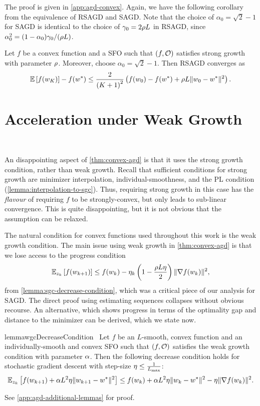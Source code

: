 \noindent The proof is given in \autoref{app:agd-convex}.
Again, we have the following corollary from the equivalence of \ac{RSAGD} and \ac{SAGD}. 
Note that the choice of \( \alpha_0 = \sqrt{2} - 1 \) for \ac{SAGD} is identical to the choice of \( \gamma_0 = 2 \sgc L \) in \ac{RSAGD}, since \( \alpha_0^2 = (1 - \alpha_0) \gamma_0 / (\sgc L) \).

\begin{corollary}
    Let \( f \) be a convex function and \oracle{} a \ac{SFO} such that \( \rbr{f, \oracle{}} \) satisfies strong growth with parameter \( \sgc \).
    Moreover, choose \( \alpha_0 = \sqrt{2} - 1 \).
    Then \ac{RSAGD} converges as  
    \[ \E\sbr{f(\w_K)} - f(\wopt) \leq \frac{2}{\rbr{K+1}^2}\rbr{f(\w_0) - f(\wopt) + \sgc L \norm{\w_0 - \wopt}^2 }. \]
\end{corollary}

\section{Acceleration under Weak Growth}~\label{sec:agd-weak-growth}

 An disappointing aspect of \autoref{thm:convex-agd} is that it uses the strong growth condition, rather than weak growth.
 Recall that sufficient conditions for strong growth are minimizer interpolation, individual-smoothness, and the \ac{PL} condition (\autoref{lemma:interpolation-to-sgc}). 
 Thus, requiring strong growth in this case has the \emph{flavour} of requiring \( f \) to be strongly-convex, but only leads to sub-linear convergence.
This is quite disappointing, but it is not obvious that the assumption can be relaxed.

The natural condition for convex functions used throughout this work is the weak growth condition.
The main issue using weak growth in \autoref{thm:convex-agd} is that we lose access to the progress condition 
\[ \Ek \sbr{f(\wkk)} \leq f(\wk) - \etak \rbr{1 - \frac{\sgc L \eta}{2}} \norm{\grad(\wk)}^2, \]
from \autoref{lemma:sgc-decrease-condition}, which was a critical piece of our analysis for \ac{SAGD}. 
The direct proof using estimating sequences collapses without obvious recourse.
An alternative, which shows progress in terms of the optimality gap and distance to the minimizer can be derived, which we state now.

 \begin{restatable}{lemma}{wgcDecreaseCondition}~\label{lemma:wgc-decrease-condition}
     Let \( f \) be an \( L \)-smooth, convex function and \oracle{} an individually-smooth and convex \ac{SFO} such that \( \rbr{f, \oracle{}} \) satisfies the weak growth condition with parameter \( \wgc \). 
    Then the following decrease condition holds for stochastic gradient descent with step-size \( \eta \leq \frac{1}{\Lmax} \):
    \[ \E_{\zk} \sbr{f(\wkk) + \wgc L^2 \eta \norm{\wkk - \wopt}^2} \leq f(\wk) + \wgc L^2 \eta \norm{\wk - \wopt}^2 - \eta \norm{\grad(\wk)}^2. \]
\end{restatable}
\noindent See \autoref{app:agd-additional-lemmas} for proof. \hfill \break

